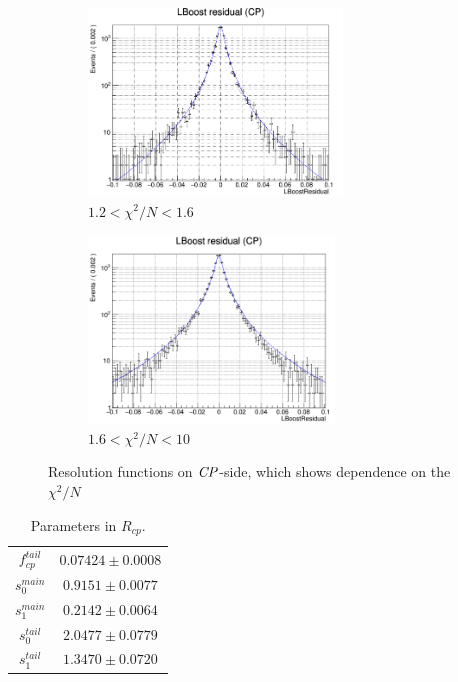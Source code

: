 \begin{figure}[htbp]
	\begin{subfigure}{0.5\linewidth}
		\caption{$1.2<\chi^2/N<1.6$}
		\includegraphics[height=5cm]{figures/residual1.2_1.6}
	\end{subfigure}
	\begin{subfigure}{0.5\linewidth}
		\caption{$1.6<\chi^2/N<10$}
		\includegraphics[height=5cm]{figures/residual1.6_10}
	\end{subfigure}
	\caption{Resolution functions on $\it{CP}$-side, which shows dependence on the $\chi^2/N$}
	\label{fig:redchi2fit}
\end{figure}

\begin{table}[H]
	\begin{minipage}[b]{1.0\linewidth}
		\centering
		\caption{Parameters in $R_{cp}$.}
		\label{tab:Rcp}
		\begin{tabular}{|c|c|}
			\hline
			$f_{cp}^{tail}$ & $0.07424 \pm 0.0008$\\
			$s_0^{main}$&  $0.9151 \pm 0.0077$ \\
			$s_1^{main}$ & $0.2142\pm 0.0064$\\
			$s_0^{tail}$ &  $2.0477\pm 0.0779$\\
			$s_1^{tail}$  & $1.3470\pm 0.0720$ \\
			\hline
		\end{tabular}
	\end{minipage}
\end{table}

